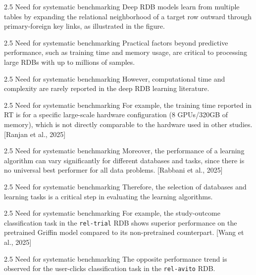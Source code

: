 \documentclass[aspectratio=169,10pt]{beamer}
\newcommand{\cit}[1]{{\scriptsize\color{gray}[#1]}}
\begin{document}
\begin{frame}{2.5 Need for systematic benchmarking}
Deep RDB models learn from multiple tables by expanding the relational neighborhood of a target row outward through primary-foreign key links, as illustrated in the figure.
\end{frame}

\begin{frame}{2.5 Need for systematic benchmarking}
Practical factors beyond predictive performance, such as training time and memory usage, are critical to processing large RDBs with up to millions of samples.
\end{frame}

\begin{frame}{2.5 Need for systematic benchmarking}
However, computational time and complexity are rarely reported in the deep RDB learning literature.
\end{frame}

\begin{frame}{2.5 Need for systematic benchmarking}
For example, the training time reported in RT is for a specific large-scale hardware configuration (8 GPUs/320GB of memory), which is not directly comparable to the hardware used in other studies.
\cit{Ranjan et al., 2025}
\end{frame}

\begin{frame}{2.5 Need for systematic benchmarking}
Moreover, the performance of a learning algorithm can vary significantly for different databases and tasks, since there is no universal best performer for all data problems.
\cit{Rabbani et al., 2025}
\end{frame}

\begin{frame}{2.5 Need for systematic benchmarking}
Therefore, the selection of databases and learning tasks is a critical step in evaluating the learning algorithms.
\end{frame}

\begin{frame}{2.5 Need for systematic benchmarking}
For example, the study-outcome classification task in the \texttt{rel-trial} RDB shows superior performance on the pretrained Griffin model compared to its non-pretrained counterpart.
\cit{Wang et al., 2025}
\end{frame}

\begin{frame}{2.5 Need for systematic benchmarking}
The opposite performance trend is observed for the user-clicks classification task in the \texttt{rel-avito} RDB.
\end{frame}
\end{document}
